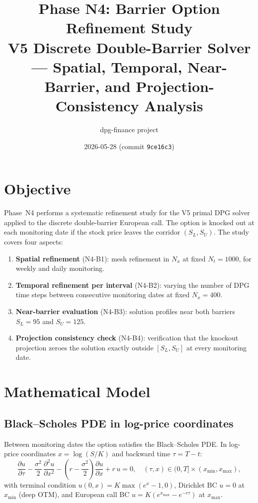 \documentclass[11pt,a4paper]{article}
\title{\textbf{Phase N4: Barrier Option Refinement Study}\\
       \large V5 Discrete Double-Barrier Solver --- Spatial, Temporal,
       Near-Barrier, and Projection-Consistency Analysis}
\author{dpg-finance project}
\date{2026-05-28 \quad (commit \texttt{9ce16c3})}
\newcommand{\Nx}{N_x}
\newcommand{\Nt}{N_t}
\newcommand{\SL}{S_L}
\newcommand{\SU}{S_U}
\begin{document}
\maketitle
\tableofcontents
\bigskip

\section{Objective}

Phase~N4 performs a systematic refinement study for the V5 primal DPG
solver applied to the discrete double-barrier European call.  The option
is knocked out at each monitoring date if the stock price leaves the
corridor $(\SL, \SU)$.  The study covers four aspects:

\begin{enumerate}[noitemsep]
  \item \textbf{Spatial refinement} (N4-B1): mesh refinement in $\Nx$
        at fixed $\Nt = 1000$, for weekly and daily monitoring.
  \item \textbf{Temporal refinement per interval} (N4-B2): varying the
        number of DPG time steps between consecutive monitoring dates
        at fixed $\Nx = 400$.
  \item \textbf{Near-barrier evaluation} (N4-B3): solution profiles
        near both barriers $\SL = 95$ and $\SU = 125$.
  \item \textbf{Projection consistency check} (N4-B4): verification
        that the knockout projection zeroes the solution exactly outside
        $[\SL, \SU]$ at every monitoring date.
\end{enumerate}

\section{Mathematical Model}

\subsection{Black--Scholes PDE in log-price coordinates}

Between monitoring dates the option satisfies the Black--Scholes PDE.
In log-price coordinates $x = \log(S/K)$ and backward time
$\tau = T - t$:
\begin{equation}
  \frac{\partial u}{\partial\tau}
  - \frac{\sigma^2}{2}\,\frac{\partial^2 u}{\partial x^2}
  - \left(r - \frac{\sigma^2}{2}\right)\frac{\partial u}{\partial x}
  + r\,u = 0,
  \quad (\tau, x) \in (0, T] \times (x_{\min}, x_{\max}),
  \label{eq:bspde}
\end{equation}
with terminal condition $u(0, x) = K\max(e^x - 1, 0)$,
Dirichlet BC $u = 0$ at $x_{\min}$ (deep OTM), and
European call BC $u = K(e^{x_{\max}} - e^{-r\tau})$ at $x_{\max}$.
\end{document}

